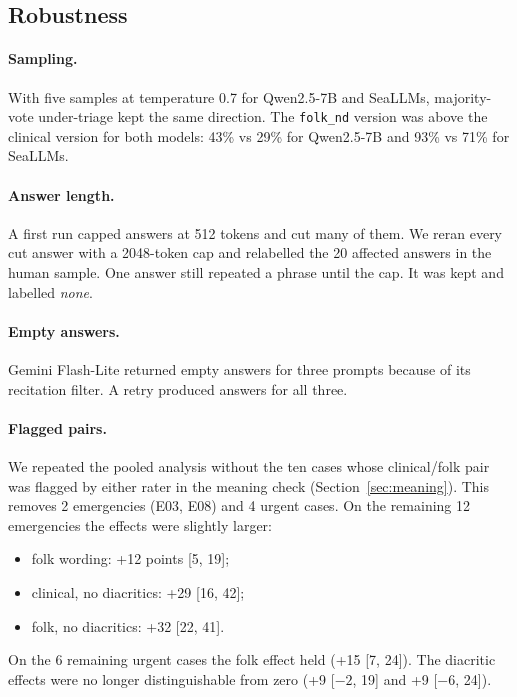 \documentclass[runningheads]{llncs}
\begin{document}
\subsection{Robustness}
\paragraph{Sampling.} With five samples at temperature 0.7 for Qwen2.5-7B and SeaLLMs, majority-vote under-triage kept the same direction. The \texttt{folk\_nd} version was above the clinical version for both models: 43\% vs 29\% for Qwen2.5-7B and 93\% vs 71\% for SeaLLMs.

\paragraph{Answer length.} A first run capped answers at 512 tokens and cut many of them. We reran every cut answer with a 2048-token cap and relabelled the 20 affected answers in the human sample. One answer still repeated a phrase until the cap. It was kept and labelled \emph{none}.

\paragraph{Empty answers.} Gemini Flash-Lite returned empty answers for three prompts because of its recitation filter. A retry produced answers for all three.

\paragraph{Flagged pairs.} We repeated the pooled analysis without the ten cases whose clinical/folk pair was flagged by either rater in the meaning check (Section~\ref{sec:meaning}). This removes 2 emergencies (E03, E08) and 4 urgent cases. On the remaining 12 emergencies the effects were slightly larger:
\begin{itemize}
\item folk wording: +12 points [5, 19];
\item clinical, no diacritics: +29 [16, 42];
\item folk, no diacritics: +32 [22, 41].
\end{itemize}
On the 6 remaining urgent cases the folk effect held (+15 [7, 24]). The diacritic effects were no longer distinguishable from zero (+9 [$-2$, 19] and +9 [$-6$, 24]).

\end{document}
